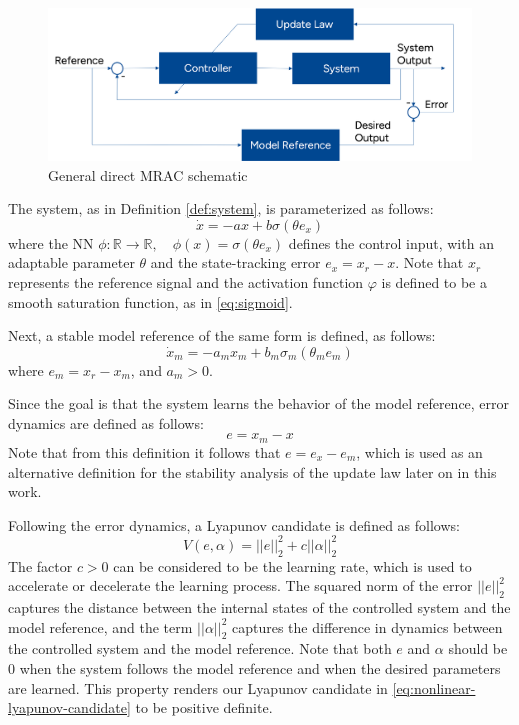 \begin{figure}[!t]
 \centering
 \includegraphics[width=0.8\linewidth]{images/MRAC_Blockdiagram.png}
 \caption{General direct MRAC schematic}
 \label{fig:nonlinear-NNC-MRAC}
\end{figure}

The system, as in Definition \ref{def:system}, is parameterized as follows:
\begin{equation}
 \dot x = -ax + b\sigma(\theta e_x)
 \label{eq:first-order-system}
\end{equation}
where the NN $\phi: \mathbb{R}\rightarrow\mathbb{R}, \quad \phi(x)=\sigma(\theta e_x)$ defines the control input, with an adaptable parameter $\theta$ and the state-tracking error $e_x=x_r - x$. Note that $x_r$ represents the reference signal and the activation function $\varphi$ is defined to be a smooth saturation function, as in \eqref{eq:sigmoid}. 

Next, a stable model reference of the same form is defined, as follows:
\begin{equation}
 \dot x_m = -a_mx_m + b_m\sigma_m(\theta_m e_m)
 \label{eq:first-order-ref}
\end{equation}
where $e_m=x_r - x_m$, and $a_m>0$.

Since the goal is that the system learns the behavior of the model reference, error dynamics are defined as follows:
\begin{equation}
 e=x_m-x
 \label{eq:error-dynamics-nonlinear}
\end{equation}
Note that from this definition it follows that $e=e_x-e_m$, which is used as an alternative definition for the stability analysis of the update law later on in this work.

Following the error dynamics, a Lyapunov candidate is defined as follows:
\begin{equation}
 V(e, \alpha) =||e||_2^2 + c||\alpha||_2^2
 \label{eq:nonlinear-lyapunov-candidate}
\end{equation}
The factor $c>0$ can be considered to be the learning rate, which is used to accelerate or decelerate the learning process. The squared norm of the error $||e||_2^2$ captures the distance between the internal states of the controlled system and the model reference, and the term $||\alpha||_2^2$ captures the difference in dynamics between the controlled system and the model reference. Note that both $e$ and $\alpha$ should be $0$ when the system follows the model reference and when the desired parameters are learned. This property renders our Lyapunov candidate in \eqref{eq:nonlinear-lyapunov-candidate} to be positive definite.

